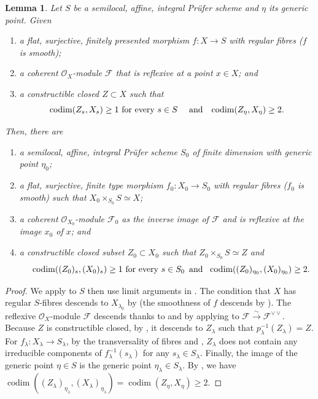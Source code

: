 \documentclass[JEP,XML,SOM,Unicode,published]{cedram}
\newenvironment{enumeratei}
{\bgroup\def\theenumi{\roman{enumi}}\def\theenumii{\arabic{enumii}}\begin{enumerate}}
{\end{enumerate}\egroup}
\let\oldvee\vee
\renewcommand{\vee}{{\scriptscriptstyle\oldvee}}
\newcommand{\gL}{\lambda}
\newcommand{\sF}{\mathscr{F}}
\newcommand{\sO}{\mathscr{O}}
\let\q\quad
\newcommand{\isoto}{\overset{\sim}{\longrightarrow}}
\newcommand{\ddual}{\vee\vee}
\DeclareMathOperator{\codim}{codim}
\newcommand{\bpf}{\begin{proof}}
\newcommand{\epf}{\end{proof}}
\newcommand{\blem}{\begin{lemma}}
\newcommand{\elem}{\end{lemma}}
\newcommand{\benuma}{\begin{enumerate}}
\newcommand{\benumr}{\begin{enumeratei}}
\newcommand{\eenuma}{\end{enumerate}}
\newcommand{\eenumr}{\end{enumeratei}}
\theoremstyle{plain}
\newtheorem{lemma}[subsection]{Lemma}
\theoremstyle{definition}
\begin{document}
\blem\label{lim-codim}
Let $S$ be a semilocal, affine, integral Prüfer scheme and $\eta$ its generic point.
Given
\benumr
\item a flat, surjective, {finitely presented} morphism $f\colon X\to S$ with regular fibres (\resp $f$ is smooth);
\item a coherent $\sO_X$\nobreakdash-mod\-ule $\sF$ that is reflexive at a point $x\in X$; and
\item a constructible closed $Z\subset X$ such that
\[
\text{$\codim(Z_s, X_s)\geq 1$ for every $s\in S$ \q and\q $\codim(Z_{\eta},X_{\eta})\geq 2$.}
\]
\eenumr
\noindent
Then, there are
\benuma
\item a semilocal, affine, integral Prüfer scheme $S_0$ of finite dimension with generic point $\eta_0$;
\item a flat, surjective, finite type morphism $f_0\colon X_{0}\to S_{0}$ with regular fibres (\resp $f_0$ is smooth) such that $X_{0}\times_{S_{0}}S\simeq X$;
\item a coherent $\sO_{X_{0}}$\nobreakdash-mod\-ule $\sF_{0}$ as the inverse image of $\sF$ and is reflexive at the image $x_0$ of $x$; and
\item a constructible closed subset $Z_{0}\subset X_{0}$ such that $Z_{{0}}\times_{S_{0}}S\simeq Z$ and
\[
\q \text{$\codim(({Z_{0}})_s, ({X_{0}})_s)\geq 1$ for every $s\in S_{0}$\, and \, $\codim(({Z_{0}})_{\eta_0},({X_{0}})_{\eta_0})\geq 2$.}
\]
\eenuma
\elem
\bpf

We apply  to $S$ then use limit arguments in \cite[\S8]{EGAIV3}.
The condition that $X$ has regular $S$-fibres descends to $X_{\lambda_0}$ by \cite[Prop.\,6.5.3]{EGAIV2} (\resp the smoothness of $f$ descends by \cite[Prop.\,17.7.8]{EGAIV4}).
The reflexive $\sO_X$\nobreakdash-mod\-ule $\sF$ descends thanks to \cite[Th.\,8.5.2]{EGAIV3} and by applying \cite[Cor.\,8.5.2.5]{EGAIV3} to $\sF\isoto \sF^{\ddual}$.
Because $Z$ is constructible closed, by \cite[Th.\,8.3.11]{EGAIV3}, it descends to $Z_{\gL}$ such that $p_{\gL}^{-1}(Z_{\gL})=Z$. For $f_{\gL}\colon X_{\gL}\to S_{\gL}$, by the transversality of fibres and \cite[Cor.\,4.2.6]{EGAIV2}, $Z_{\gL}$ does not contain any irreducible components of $f_{\gL}^{-1}(s_{\gL})$ for any $s_{\gL}\in S_{\gL}$.
Finally, the image of the generic point $\eta\in S$ is the generic point $\eta_{\gL}\in S_{\gL}$. By \cite[Cor.\,6.1.4]{EGAIV2}, we have $\codim((Z_{\gL})_{\eta_{\gL}}, (X_{\gL})_{\eta_{\gL}})=\codim(Z_{\eta}, X_{\eta})\geq 2$.
\epf
\end{document}
